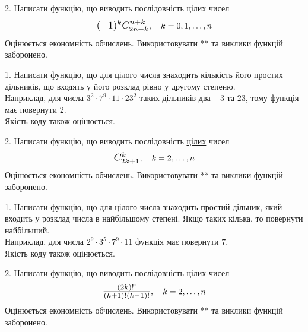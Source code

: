 \documentclass[12pt, ukrainian]{article}
\begin{document}
\begin{Large}
\vspace{10mm}

\newpage

2. 
Написати функцію, що виводить послідовність \underline{цілих} чисел
$$\scalebox{1.2}{$(-1)^{k}C_{2n+k}^{n+k}$}, \quad k=0,1,\ldots,n$$
Оцінюється економність обчислень. Використовувати ** та виклики функцій заборонено.

\newpage




1. Написати функцію, що для цілого числа знаходить кількість його простих дільників, що входять у його розклад рівно у другому степеню. \\ Наприклад, для числа $3^2{\cdot}7^9{\cdot}11{\cdot}23^{2}$ таких дільників два – $3$ та $23$, тому функція має повернути $2$.\\	Якість коду також оцінюється. 



\vspace{10mm}

\newpage

2. 
Написати функцію, що виводить послідовність \underline{цілих} чисел
$$\scalebox{1.2}{$C_{2k+1}^{k}$}, \quad k=2,\ldots,n$$
Оцінюється економність обчислень. Використовувати ** та виклики функцій заборонено.

\newpage




1. Написати функцію, що для цілого числа знаходить простий дільник, який входить у розклад числа в найбільшому степені. Якщо таких кілька, то повернути найбільший. \\ Наприклад, для числа $2^{9}{\cdot}3^5{\cdot}7^9{\cdot}11$ функція має повернути $7$.\\	Якість коду також оцінюється. 



\vspace{10mm}

\newpage

2. 
Написати функцію, що виводить послідовність \underline{цілих} чисел
$$\scalebox{1.2}{$\frac{(2k)!!}{(k+1)!(k-1)!}$}, \quad k=2,\ldots,n$$
Оцінюється економність обчислень. Використовувати ** та виклики функцій заборонено.

\newpage





\end{Large}
\end{document}
